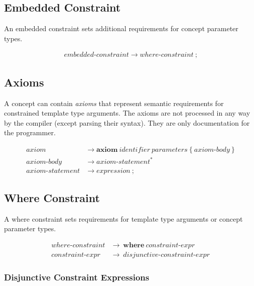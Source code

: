 \documentclass[a4paper,oneside,11pt]{article}
\begin{document}
\subsection{Embedded Constraint}\label{embeddedconstraint}

An embedded constraint sets additional requirements for concept parameter types.

\begin{align*}
embedded\textrm{-}constraint \rightarrow \hyperref[whereconstraint]{where\textrm{-}constraint} \> \texttt{;}
\end{align*}

\subsection{Axioms}\label{axiom}

A concept can contain \emph{axioms} that represent semantic requirements for constrained template type arguments.
The axioms are not processed in any way by the compiler (except parsing their syntax).
They are only documentation for the programmer.

\begin{align*}
axiom &\rightarrow \textbf{axiom} \> \hyperref[identifier]{identifier} \> \hyperref[parameters]{parameters} \> \texttt{\{} \> axiom\textrm{-}body \> \texttt{\}}\\
axiom\textrm{-}body &\rightarrow axiom\textrm{-}statement^*\\
axiom\textrm{-}statement &\rightarrow \hyperref[expression]{expression} \> \texttt{;}
\end{align*}

\subsection{Where Constraint}\label{sec:where-constraint}\label{whereconstraint}\label{constraintexpr}

A where constraint sets requirements for template type arguments or concept parameter types.

\begin{align*}
where\textrm{-}constraint &\rightarrow \> \textbf{where} \> constraint\textrm{-}expr\\
constraint\textrm{-}expr  &\rightarrow \> \hyperref[disjunctiveconstraint]{disjunctive\textrm{-}constraint\textrm{-}expr}
\end{align*}

\subsubsection{Disjunctive Constraint Expressions}\label{disjunctiveconstraint}
\end{document}
